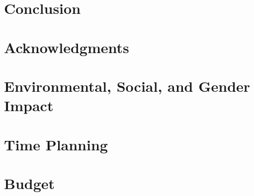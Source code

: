 \documentclass[a4paper, 11pt, titlepage, twoside]{article}
\begin{document}
\section{Conclusion}\label{Conclusion}

\newpage


\section*{Acknowledgments}\label{acknow} 


\appendix
\cleardoublepage
\section{Environmental, Social, and Gender Impact}

\cleardoublepage
\section{Time Planning}

\cleardoublepage
\section{Budget}

\cleardoublepage
\printbibliography
\end{document}
